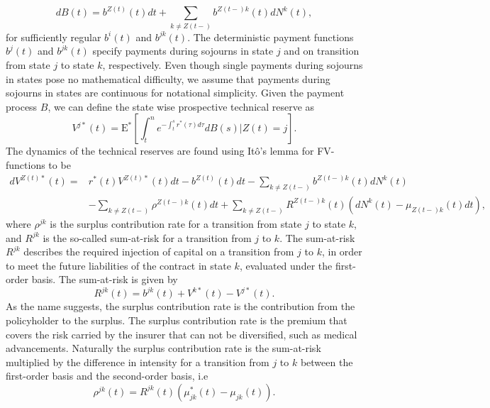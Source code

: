 \documentclass[12pt]{article}
\newcommand{\E}{\text{E}}
\theoremstyle{my_thm}
\begin{document}
$$
dB(t)=b^{Z(t)}(t) dt +\sum_{k \neq Z(t-)} b^{Z(t-)k}(t)dN^k(t),
$$
for sufficiently regular $b^i(t)$ and $b^{jk}(t)$. The deterministic payment functions $b^j(t)$ and $b^{jk}(t)$ specify payments during sojourns in state $j$ and on transition from state $j$ to state $k$, respectively. Even though single payments during sojourns in states pose no mathematical difficulty, we assume that payments during sojourns in states are continuous for notational simplicity. Given the payment process $B$, we can define the state wise prospective technical reserve as
$$
V^{j*}(t)=\E^*\left[ \int_t^n  e^{-\int_t^s r^*(\tau) d\tau} dB(s) |Z(t)=j \right].
$$
The dynamics of the technical reserves are found using Itô's lemma for FV-functions to be
\begin{align}
dV^{Z(t)*}(t)=&r^*(t)V^{Z(t)*}(t)dt - b^{Z(t)}(t)dt -\sum_{k\neq Z(t-)}b^{Z(t-)k}(t) dN^k(t)\nonumber
\\
&-\sum_{k\neq Z(t-)} \rho^{Z(t-)k}(t) dt
+
\sum_{k\neq Z(t-)} R^{Z(t-)k}(t)(dN^k(t)-\mu_{Z(t-)k}(t) dt), \label{eq:AAP}
\end{align}
where $\rho^{jk}$ is the surplus contribution rate for a transition from state $j$ to state $k$, and $R^{jk}$ is the so-called sum-at-risk for a transition from $j$ to $k$. The sum-at-risk $R^{jk}$ describes the required injection of capital on a transition from $j$ to $k$, in order to meet the future liabilities of the contract in state $k$, evaluated under the first-order basis. The sum-at-risk is given by
$$
R^{jk}(t)=b^{jk}(t)+V^{k*}(t)-V^{j*}(t).
$$
As the name suggests, the surplus contribution rate is the contribution from the policyholder to the surplus. The surplus contribution rate is the premium that covers the risk carried by the insurer that can not be diversified, such as medical advancements. Naturally the surplus contribution rate is the sum-at-risk multiplied by the difference in intensity for a transition from $j$ to $k$ between the first-order basis and the second-order basis, i.e
$$
\rho^{jk}(t)=R^{jk}(t)(\mu^*_{jk}(t)-\mu_{jk}(t)).
$$
\end{document}
